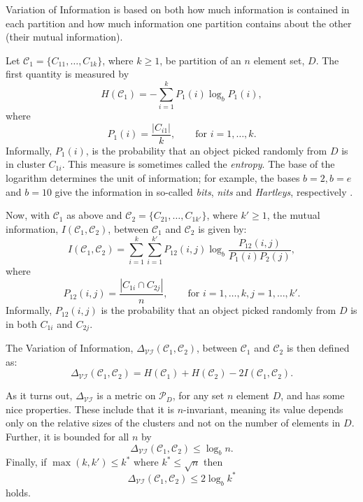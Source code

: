 \documentclass[a4paper]{report}
\newcommand{\dset}{D}
\newcommand{\clus}{\mathcal{C}}
\newcommand{\parts}{\mathcal{P}}
\newcommand{\partcompare}[1]{\Delta_{\mathcal{#1}}(\clus_1,\clus_2)}
\begin{document}
Variation of Information is based on both how much information is contained in
each partition and how much information one partition contains about the other
(their mutual information).

Let $\clus_1 = \{C_{11},\dotsc,C_{1k}\}$, where $k \geq 1$, be partition of an
$n$ element set, $\dset$.  The first quantity is measured by
\begin{equation*}
  H(\clus_1) = -\sum_{i=1}^{k} P_1(i) \log_b P_1(i),
\end{equation*}
where
\begin{equation*}
  P_1(i) = \frac{|C_{i1}|}{k}, \qquad \text{for $i = 1,\dotsc,k$}.
\end{equation*}
Informally, $P_1(i)$, is the probability that an object picked randomly from
$\dset$ is in cluster $C_{1i}$.  This measure is sometimes called the
\textit{entropy}.  The base of the logarithm determines the unit of
information; for example, the bases $b=2,b=e$ and $b=10$ give the information
in so-called \textit{bits}, \textit{nits} and \textit{Hartleys}, respectively
\citep[see][]{kullback68information}.

Now, with $\clus_1$ as above and $\clus_2 = \{C_{21},\dotsc,C_{1k'}\}$, where
$k' \geq 1$, the mutual information, $I(\clus_1,\clus_2)$, between $\clus_1$
and $\clus_2$ is given by:
\begin{equation*}
  I(\clus_1,\clus_2) = \sum_{i=1}^{k} \sum_{i=1}^{k'}
                      P_{12}(i,j) \log_b \frac{P_{12}(i,j)}{P_1(i)P_2(j)},
\end{equation*}
where
\begin{equation*}
  P_{12}(i,j) = \frac{|C_{1i} \cap C_{2j}|}{n}, \qquad \text{for $i =
    1,\dotsc,k,j = 1,\dotsc,k'$}.
\end{equation*}
Informally, $P_{12}(i,j)$ is the probability that an object picked randomly
from $\dset$ is in both $C_{1i}$ and $C_{2j}$.

The Variation of Information, $\partcompare{VI}$, between $\clus_1$ and
$\clus_2$ is then defined as:
\begin{equation*}
  \partcompare{VI} = H(\clus_1) + H(\clus_2) - 2I(\clus_1,\clus_2).
\end{equation*}

As it turns out, $\Delta_{\mathcal{VI}}$ is a metric on $\parts_{\dset}$, for
any set $n$ element $\dset$, and has some nice properties.  These include that
it is $n$-invariant, meaning its value depends only on the relative sizes of
the clusters and not on the number of elements in $\dset$.  Further, it is
bounded for all $n$ by
\begin{equation*}
  \partcompare{VI} \leq \log_b n.
\end{equation*}
Finally, if $\max(k,k') \leq k^*$ where $k^* \leq \sqrt{n}$ then
\begin{equation*}
  \partcompare{VI} \leq 2 \log_b k^*
\end{equation*}
holds.
\end{document}
